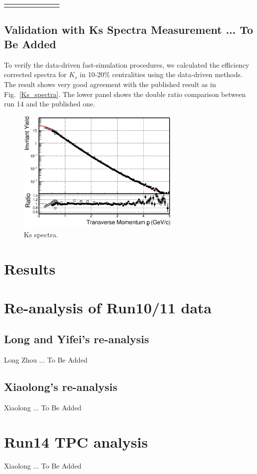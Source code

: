 \documentclass[a4paper]{article}
\begin{document}
\begin{table}[htp]
\begin{center}
\begin{tabular}{l|l|l|l|l|l|l|l}
  \Xhline{1.6pt}
	\end{tabular}
	\end{center}
\end{table}


\subsection{Validation with Ks Spectra Measurement ... To Be Added}

 To verify the data-driven fast-simulation procedures, we calculated the efficiency corrected spectra for $K_{s}$ in 10-20\% centralities using the data-driven methods. The result shows very good agreement with the published result as in Fig.~\ref{Ks_spectra}. The lower panel shows the double ratio comparison between run 14 and the published one.

\begin{figure}
\centering
\includegraphics[width=0.7\textwidth]{fig/Ks_spectra_PtCut_0.eps}
\caption{\label{fig:Ks_spectra}Ks spectra.}
\end{figure}

\section{\label{results}Results}

\section{\label{Run1011}Re-analysis of Run10/11 data}

\subsection{Long and Yifei's re-analysis}

Long Zhou ... To Be Added

\subsection{Xiaolong's re-analysis}

Xiaolong ... To Be Added

\section{\label{Run14TPC}Run14 TPC analysis}

Xiaolong ... To Be Added

\clearpage



\end{document}
